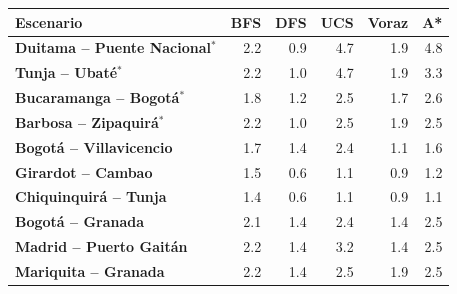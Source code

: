 \renewcommand{\arraystretch}{1.2}
\begin{tabular}{|l|r|r|r|r|r|}
\hline
\rowcolor{gray!20} \textbf{Escenario} & \textbf{BFS} & \textbf{DFS} & \textbf{UCS} & \textbf{Voraz} & \textbf{A*} \\
\hline
\textbf{Duitama -- Puente Nacional$^{*}$} & 2.2 & 0.9 & 4.7 & 1.9 & 4.8 \\
\hline
\textbf{Tunja -- Ubaté$^{*}$} & 2.2 & 1.0 & 4.7 & 1.9 & 3.3 \\
\hline
\textbf{Bucaramanga -- Bogotá$^{*}$} & 1.8 & 1.2 & 2.5 & 1.7 & 2.6 \\
\hline
\textbf{Barbosa -- Zipaquirá$^{*}$} & 2.2 & 1.0 & 2.5 & 1.9 & 2.5 \\
\hline
\textbf{Bogotá -- Villavicencio} & 1.7 & 1.4 & 2.4 & 1.1 & 1.6 \\
\hline
\textbf{Girardot -- Cambao} & 1.5 & 0.6 & 1.1 & 0.9 & 1.2 \\
\hline
\textbf{Chiquinquirá -- Tunja} & 1.4 & 0.6 & 1.1 & 0.9 & 1.1 \\
\hline
\textbf{Bogotá -- Granada} & 2.1 & 1.4 & 2.4 & 1.4 & 2.5 \\
\hline
\textbf{Madrid -- Puerto Gaitán} & 2.2 & 1.4 & 3.2 & 1.4 & 2.5 \\
\hline
\textbf{Mariquita -- Granada} & 2.2 & 1.4 & 2.5 & 1.9 & 2.5 \\
\hline
\end{tabular}
